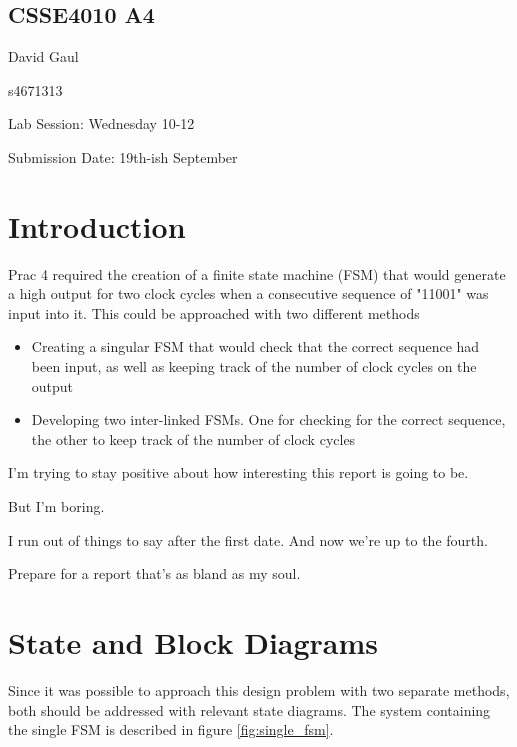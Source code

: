 \documentclass[12pt,a4paper]{article}
\begin{document}
\begin{center}
\bigskip
\section*{CSSE4010 A4}
\end{center}

David Gaul

s4671313

Lab Session: Wednesday 10-12

Submission Date: 19th-ish September

\section{Introduction}

Prac 4 required the creation of a finite state machine (FSM) that would generate a high output for two clock cycles when a consecutive sequence of "11001" was input into it. This could be approached with two different methods

\begin{itemize}
    \item Creating a singular FSM that would check that the correct sequence had been input, as well as keeping track of the number of clock cycles on the output
    \item Developing two inter-linked FSMs. One for checking for the correct sequence, the other to keep track of the number of clock cycles
\end{itemize}

I'm trying to stay positive about how interesting this report is going to be. 

But I'm boring. 

I run out of things to say after the first date. And now we're up to the fourth. 

Prepare for a report that's as bland as my soul.

\section{State and Block Diagrams}

Since it was possible to approach this design problem with two separate methods, both should be addressed with relevant state diagrams. The system containing the single FSM is described in figure \ref{fig:single_fsm}.
\end{document}
